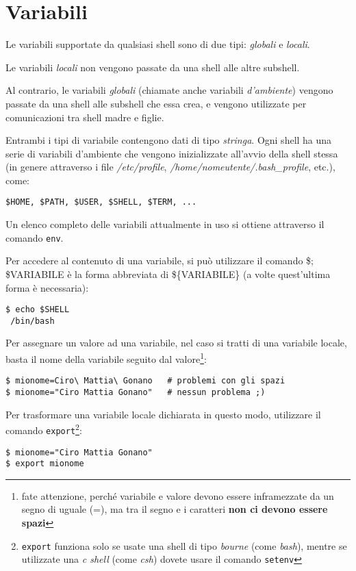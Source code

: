 \section{Variabili}
\label{sec:sub:var}
Le variabili supportate da qualsiasi shell sono di due tipi: \emph{globali} e
\emph{locali}.

Le variabili \emph{locali} non vengono passate da una shell alle altre
subshell.

Al contrario, le variabili \emph{globali} (chiamate anche variabili
\emph{d'ambiente}) vengono passate da una shell alle subshell che essa crea, e
vengono utilizzate per comunicazioni tra shell madre e figlie.

Entrambi i tipi di variabile contengono dati di tipo \textit{stringa}. Ogni
shell ha una serie di variabili d'ambiente che vengono inizializzate all'avvio
della shell stessa (in genere attraverso i file \textit{/etc/profile},
\textit{/home/nomeutente/.bash\_profile}, etc.), come:
\begin{verbatim}
$HOME, $PATH, $USER, $SHELL, $TERM, ...
\end{verbatim}
Un elenco completo delle variabili attualmente in uso si ottiene attraverso il
comando \texttt{env}.

Per accedere al contenuto di una variabile, si pu\`o utilizzare il comando \$;
\$VARIABILE \`e la forma abbreviata di \$\{VARIABILE\} (a volte quest'ultima
forma \`e necessaria):
\begin{verbatim}
$ echo $SHELL
 /bin/bash
\end{verbatim}

Per assegnare un valore ad una variabile, nel caso si tratti di una variabile
locale, basta il nome della variabile seguito dal valore\footnote{fate
attenzione, perch\'e variabile e valore devono essere inframezzate da un segno
di uguale (=), ma tra il segno e i caratteri \textbf{non ci devono essere
spazi}}:
\begin{verbatim}
$ mionome=Ciro\ Mattia\ Gonano   # problemi con gli spazi
$ mionome="Ciro Mattia Gonano"   # nessun problema ;)
\end{verbatim}
Per trasformare una variabile locale dichiarata in questo modo, utilizzare il
comando \texttt{export}\footnote{\texttt{export} funziona solo se usate una
shell di tipo \emph{bourne} (come \emph{bash}), mentre se utilizzate una
\emph{c shell} (come \emph{csh}) dovete usare il comando \texttt{setenv}}:
\begin{verbatim}
$ mionome="Ciro Mattia Gonano"
$ export mionome
\end{verbatim}

